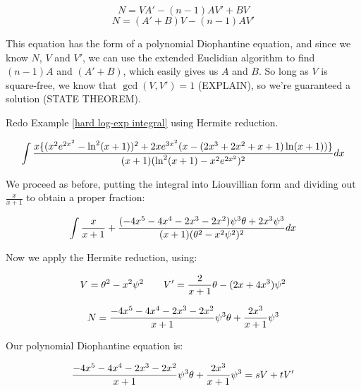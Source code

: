 $$N = VA' - (n-1)AV' + BV$$
$$N = (A'+B)V - (n-1)AV'$$

This equation has the form of a polynomial Diophantine equation, and
since we know $N$, $V$ and $V'$, we can use the extended Euclidian
algorithm to find $(n-1)A$ and $(A'+B)$, which easily gives us $A$ and
$B$.  So long as $V$ is square-free, we know that $\gcd(V,V')=1$
(EXPLAIN), so we're guaranteed a solution (STATE THEOREM).

\example
Redo Example \ref{hard log-exp integral} using Hermite reduction.

$$\int{{x\{(x^2e^{2x^2}-\ln^2(x+1))^2+2xe^{3x^2}(x-(2x^3+2x^2+x+1)\ln(x+1))\}}\over{(x+1)(\ln^2(x+1) - x^2e^{2x^2})^2}} dx$$

We proceed as before, putting the integral into Liouvillian form
and dividing out $\frac{x}{x+1}$ to obtain a proper fraction:

$$\int {x\over{x+1}} + {{(-4x^5-4x^4-2x^3-2x^2)\psi^3\theta + {2x^3}\psi^3}\over{(x+1)(\theta^2 - x^2\psi^2)^2}} dx$$

Now we apply the Hermite reduction, using:

$$V = \theta^2 - x^2\psi^2 \qquad V' = {2\over{x+1}}\theta - (2x+4x^3)\psi^2$$

$$N = {{{-4x^5-4x^4-2x^3-2x^2}\over{x+1}}\psi^3\theta + {{2x^3}\over{x+1}}\psi^3} $$

\vfill\eject

Our polynomial Diophantine equation is:

$${{{-4x^5-4x^4-2x^3-2x^2}\over{x+1}}\psi^3\theta + {{2x^3}\over{x+1}}\psi^3}
  = sV + tV'$$

